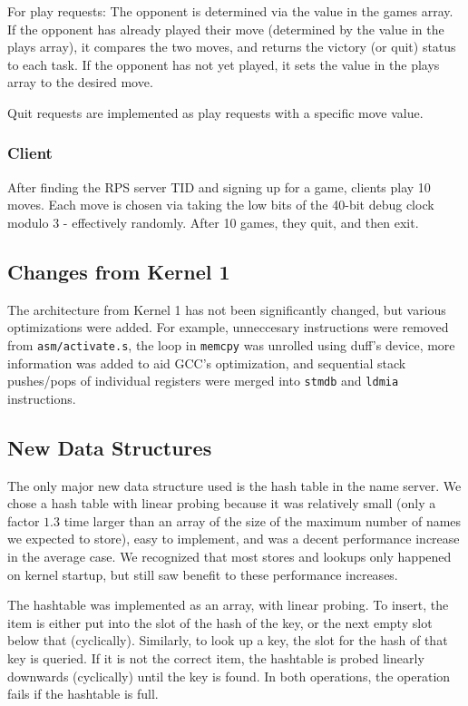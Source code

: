 \documentclass{article}
\begin{document}
   For play requests: The opponent is determined via the value in the games array.
   If the opponent has already played their move (determined by the value in the plays array), it compares the two moves, and returns the victory (or quit) status to each task. 
   If the opponent has not yet played, it sets the value in the plays array to the desired move.

   Quit requests are implemented as play requests with a specific move value.
\subsubsection{Client}
    After finding the RPS server TID and signing up for a game, clients play 10 moves. Each move is chosen via taking the low bits of the 40-bit debug clock modulo 3 - effectively randomly. After 10 games, they quit, and then exit.

\subsection{Changes from Kernel 1}
    The architecture from Kernel 1 has not been significantly changed, but various optimizations were added. For example, unneccesary instructions were removed from \verb|asm/activate.s|, the loop in \verb|memcpy| was unrolled using duff's device, more information was added to aid GCC's optimization, and sequential stack pushes/pops of individual registers were merged into \verb|stmdb| and \verb|ldmia| instructions.
\subsection{New Data Structures}
    The only major new data structure used is the hash table in the name server. We chose a hash table with linear probing because it was relatively small (only a factor $1.3$ time larger than an array of the size of the maximum number of names we expected to store), easy to implement, and was a decent performance increase in the average case. We recognized that most stores and lookups only happened on kernel startup, but still saw benefit to these performance increases.

    The hashtable was implemented as an array, with linear probing. To insert, the item is either put into the slot of the hash of the key, or the next empty slot below that (cyclically).
    Similarly, to look up a key, the slot for the hash of that key is queried.
    If it is not the correct item, the hashtable is probed linearly downwards (cyclically) until the key is found.
    In both operations, the operation fails if the hashtable is full.
\end{document}
